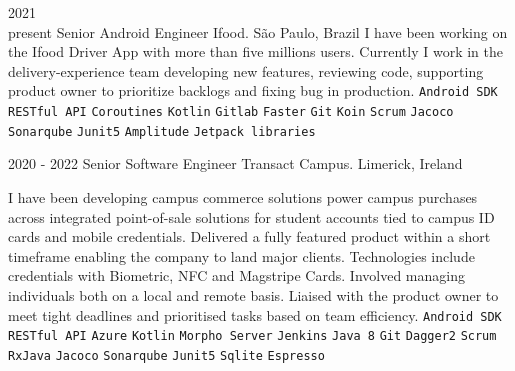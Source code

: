 \documentclass[9pt]{developercv} %
\begin{document}
\begin{entrylist}
	\entry
		{2021\\\footnotesize{present}}
		{Senior Android Engineer}
		{Ifood. São Paulo, Brazil}
{
I have been working on the Ifood Driver App with more than five millions users. Currently I work in the delivery-experience team developing new features, reviewing code, supporting product owner to prioritize backlogs and fixing bug in production.
 	{
 		\texttt{Android SDK}\slashsep
		 \texttt{RESTful API}\slashsep
		 \texttt{Coroutines}\slashsep
		 \texttt{Kotlin}\slashsep
		 \texttt{Gitlab}\slashsep
		 \texttt{Faster}\slashsep
		 \texttt{Git}\slashsep
		 \texttt{Koin}\slashsep
		 \texttt{Scrum}\slashsep
		 \texttt{Jacoco}\slashsep
		 \texttt{Sonarqube}\slashsep
		 \texttt{Junit5}\slashsep
		 \texttt{Amplitude}\slashsep
		 \texttt{Jetpack libraries}\slashsep
	}
}

\end{entrylist}
\begin{entrylist}
	\entry
		{2020 - 2022}
		{Senior Software Engineer}
		{Transact Campus. Limerick, Ireland}
{

I have been developing campus commerce solutions power campus purchases across integrated point-of-sale solutions for student accounts tied to campus ID cards and mobile credentials. Delivered a fully featured product within a short timeframe enabling the company to land major clients. Technologies include credentials with Biometric, NFC and Magstripe Cards. 
\newline
\newline
Involved managing individuals both on a local and remote basis. Liaised with the product owner to meet tight deadlines and prioritised tasks based on team efficiency.
 	{
 		\texttt{Android SDK}\slashsep
		 \texttt{RESTful API}\slashsep
		 \texttt{Azure}\slashsep
		 \texttt{Kotlin}\slashsep
		 \texttt{Morpho Server}\slashsep
		 \texttt{Jenkins}\slashsep
		 \texttt{Java 8}\slashsep
		 \texttt{Git}\slashsep
		 \texttt{Dagger2}\slashsep
		 \texttt{Scrum}\slashsep
		 \texttt{RxJava}\slashsep
		 \texttt{Jacoco}\slashsep
		 \texttt{Sonarqube}\slashsep
		 \texttt{Junit5}\slashsep
		 \texttt{Sqlite}\slashsep
		 \texttt{Espresso}\slashsep
	}
}

\end{entrylist}
\end{document}
